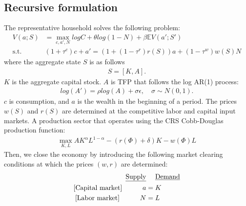 \subsection*{Recursive formulation}
The representative household solves the following problem:
\begin{align*}
  V(a;S) &= \max_{c,a',N} log C + 
  \theta log(1-N)+ \beta \mathbb{E}V(a';S')
  \\
  \text{s.t. }& 
  (1+\tau^{c})c+a' = (1+(1-\tau^{r})r(S))a + (1-\tau^{w})w(S)N
\end{align*}
where the aggregate state $S$ is as follows
\begin{align*}
  S = [K,A].
\end{align*}
$K$ is the aggregate capital stock. $A$ is TFP that follows the log AR(1) process:
\begin{align*}
  log(A') = \rho log(A) + \sigma\epsilon,\quad\sigma\sim N(0,1).
\end{align*}
$c$ is consumption, and $a$ is the wealth in the beginning of a period. 
The prices $w(S)$ and $r(S)$ are determined at the competitive labor and capital input markets.
A production sector that operates using the CRS Cobb-Douglas production function:
\begin{align*}
	\max_{K,L} A K^{\alpha}L^{1-\alpha} - (r(\Phi)+\delta)K - w(\Phi)L
\end{align*}
Then, we close the economy by introducing the following market clearing conditions at which the prices $(w,r)$ are determined:
\begin{align*}
	\text{\underline{Supply}}&\quad\text{ \underline{Demand}}
	\\
	\text{[Capital market]}\quad\qquad  a &= K
	\\
	\text{[Labor market]}\quad\qquad N &= L
\end{align*}

